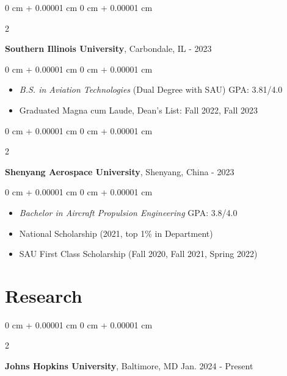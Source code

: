 \documentclass[10pt, letterpaper]{article}
\newenvironment{highlights}{
    \begin{itemize}[
        topsep=0.10 cm,
        parsep=0.10 cm,
        partopsep=0pt,
        itemsep=0pt,
        leftmargin=0 cm + 10pt
    ]
}{
    \end{itemize}
} %
\newenvironment{onecolentry}{
    \begin{adjustwidth}{
        0 cm + 0.00001 cm
    }{
        0 cm + 0.00001 cm
    }
}{
    \end{adjustwidth}
} %
\newenvironment{twocolentry}[2][]{
    \onecolentry
    \def\secondColumn{#2}
    \setcolumnwidth{\fill, 4.5 cm}
    \begin{paracol}{2}
}{ 
    \switchcolumn \raggedleft \secondColumn
    \end{paracol}
    \endonecolentry
} %
\begin{document}
    \vspace{0.2 cm}

    \begin{twocolentry}{
        2022 - 2023
    }
        \textbf{Southern Illinois University}, Carbondale, IL\end{twocolentry}

    \vspace{0.10 cm}
    \begin{onecolentry}
        \begin{highlights}

            \item \textsl{B.S. in Aviation Technologies} (Dual Degree with SAU) \hfill{GPA: 3.81/4.0}

            \item Graduated Magna cum Laude, Dean's List: Fall 2022, Fall 2023
         
        \end{highlights}
    \end{onecolentry}

    \vspace{0.2 cm}

    \begin{twocolentry}{
        2019 - 2023
    }
        \textbf{Shenyang Aerospace University}, Shenyang, China\end{twocolentry}

    \vspace{0.10 cm}
    \begin{onecolentry}
        \begin{highlights}

            \item \textsl{Bachelor in Aircraft Propulsion Engineering}
            \hfill{GPA: 3.8/4.0}

            \item National Scholarship (2021, top 1\% in Department)
            \item SAU First Class Scholarship (Fall 2020, Fall 2021, Spring 2022)
            
        \end{highlights}
    \end{onecolentry}


    \section{Research}

    \begin{twocolentry}{
        Jan. 2024 - Present
    }
        \textbf{Johns Hopkins University}, Baltimore, MD\end{twocolentry}
\end{document}
